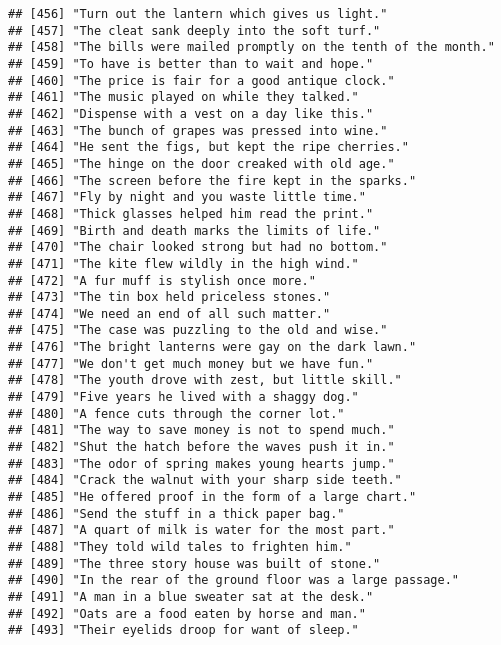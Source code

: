 \documentclass[
]{article}
\begin{document}
\begin{verbatim}
## [456] "Turn out the lantern which gives us light."               
## [457] "The cleat sank deeply into the soft turf."                
## [458] "The bills were mailed promptly on the tenth of the month."
## [459] "To have is better than to wait and hope."                 
## [460] "The price is fair for a good antique clock."              
## [461] "The music played on while they talked."                   
## [462] "Dispense with a vest on a day like this."                 
## [463] "The bunch of grapes was pressed into wine."               
## [464] "He sent the figs, but kept the ripe cherries."            
## [465] "The hinge on the door creaked with old age."              
## [466] "The screen before the fire kept in the sparks."           
## [467] "Fly by night and you waste little time."                  
## [468] "Thick glasses helped him read the print."                 
## [469] "Birth and death marks the limits of life."                
## [470] "The chair looked strong but had no bottom."               
## [471] "The kite flew wildly in the high wind."                   
## [472] "A fur muff is stylish once more."                         
## [473] "The tin box held priceless stones."                       
## [474] "We need an end of all such matter."                       
## [475] "The case was puzzling to the old and wise."               
## [476] "The bright lanterns were gay on the dark lawn."           
## [477] "We don't get much money but we have fun."                 
## [478] "The youth drove with zest, but little skill."             
## [479] "Five years he lived with a shaggy dog."                   
## [480] "A fence cuts through the corner lot."                     
## [481] "The way to save money is not to spend much."              
## [482] "Shut the hatch before the waves push it in."              
## [483] "The odor of spring makes young hearts jump."              
## [484] "Crack the walnut with your sharp side teeth."             
## [485] "He offered proof in the form of a large chart."           
## [486] "Send the stuff in a thick paper bag."                     
## [487] "A quart of milk is water for the most part."              
## [488] "They told wild tales to frighten him."                    
## [489] "The three story house was built of stone."                
## [490] "In the rear of the ground floor was a large passage."     
## [491] "A man in a blue sweater sat at the desk."                 
## [492] "Oats are a food eaten by horse and man."                  
## [493] "Their eyelids droop for want of sleep."                   

\end{verbatim}
\end{document}

